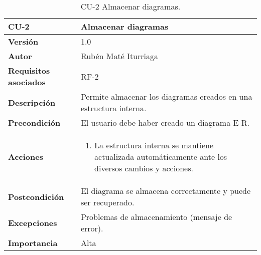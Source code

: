 \begin{table}[p]
	\centering
	\begin{tabularx}{\linewidth}{ p{} p{} }
		\toprule
		\textbf{CU-2}    & \textbf{Almacenar diagramas}\\
		\toprule
		\textbf{Versión}              & 1.0    \\
	\textbf{Autor}                & Rubén Maté Iturriaga \\
		\textbf{Requisitos asociados} & RF-2 \\
		\textbf{Descripción}          & Permite almacenar los diagramas creados en una estructura interna. \\
		\textbf{Precondición}         & El usuario debe haber creado un diagrama E-R. \\
		\textbf{Acciones}             &
		\begin{enumerate}
			\def\labelenumi{\arabic{enumi}.}
			\tightlist
            \item La estructura interna se mantiene actualizada automáticamente ante los diversos cambios y acciones.
		\end{enumerate}\\
		\textbf{Postcondición}        & El diagrama se almacena correctamente y puede ser recuperado. \\
		\textbf{Excepciones}          & Problemas de almacenamiento (mensaje de error). \\
		\textbf{Importancia}          & Alta \\
		\bottomrule
	\end{tabularx}
	\caption{CU-2 Almacenar diagramas.}
\end{table}

